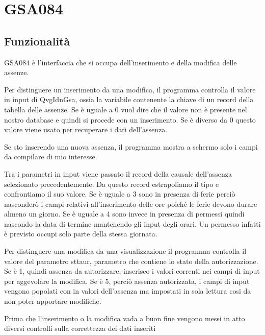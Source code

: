 \documentclass[target=bach,aauheader=,style=]{thud}
\begin{document}
\section{GSA084}
\subsection{Funzionalità}
GSA084 è l'interfaccia che si occupa dell'inserimento e della modifica delle assenze.

Per distinguere un inserimento da una modifica, il programma controlla il valore in input di QvgIdnGsa, ossia la variabile contenente la chiave di un record della tabella delle assenze.
Se è uguale a 0 vuol dire che il valore non è presente nel nostro database e quindi si procede con un inserimento.
Se è diverso da 0 questo valore viene usato per recuperare i dati dell'assenza.

Se sto inserendo una nuova assenza, il programma mostra a schermo solo i campi da compilare di mio interesse.

Tra i parametri in input viene passato il record della causale dell'assenza selezionato precedentemente. Da questo record estrapoliamo il tipo e confrontiamo il suo valore.
Se è uguale a 3 sono in presenza di ferie perciò nasconderò i campi relativi all'inserimento delle ore poiché le ferie devono durare almeno un giorno.
Se è uguale a 4 sono invece in presenza di permessi quindi nascondo la data di termine mantenendo gli input degli orari. Un permesso infatti è previsto occupi solo parte della stessa giornata.


Per distinguere una modifica da una visualizzazione il programma controlla il valore del parametro sttaur, parametro che contiene lo stato della autorizzazione.
Se è 1, quindi assenza da autorizzare, inserisco i valori correnti nei campi di input per aggevolare la modifica.
Se è 5, perciò assenza autorizzata, i campi di input vengono popolati con in valori dell'assenza ma impostati in sola lettura cosi da non poter apportare modifiche.

Prima che l'inserimento o la modifica vada a buon fine vengono messi in atto diversi controlli sulla correttezza dei dati inseriti
\end{document}
